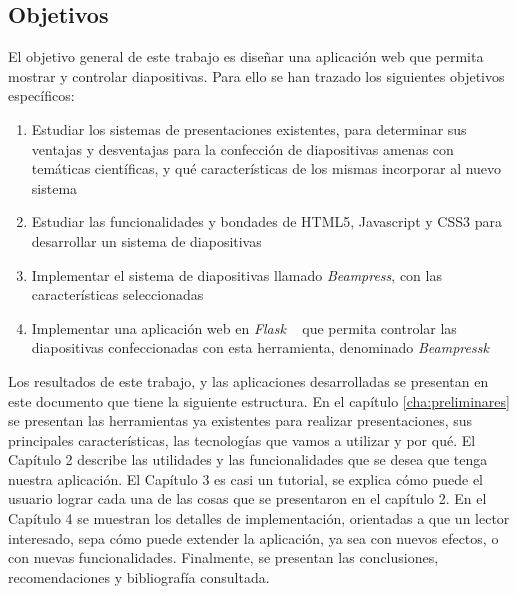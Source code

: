 \begin{introduction}
	\section*{Objetivos} %
	\label{sec:objetivos}

		El objetivo general de este trabajo es diseñar una aplicación web que permita mostrar y controlar diapositivas. Para ello se han trazado los siguientes objetivos específicos:

		\begin{enumerate}
			\item Estudiar los sistemas de presentaciones existentes, para determinar sus ventajas y desventajas para la confección de diapositivas amenas con temáticas científicas, y qué características de los mismas incorporar al nuevo sistema
			\item Estudiar las funcionalidades y bondades de HTML5, Javascript y CSS3 para desarrollar un sistema de diapositivas
			\item Implementar el sistema de diapositivas llamado \textit{Beampress}, con las características seleccionadas
			\item Implementar una aplicación web en \textit{Flask} ~\cite{flask} que permita controlar las diapositivas confeccionadas con esta herramienta, denominado \textit{Beampressk}
		\end{enumerate}

	
		Los resultados de este trabajo, y las aplicaciones desarrolladas se presentan en este documento que tiene la siguiente estructura. En el capítulo \ref{cha:preliminares} se presentan las herramientas ya existentes para realizar presentaciones, sus principales características, las tecnologías que vamos a utilizar y por qué. El Capítulo 2 describe las utilidades y las funcionalidades que se desea que tenga nuestra aplicación. El Capítulo 3 es casi un tutorial, se explica cómo puede el usuario lograr cada una de las cosas que se presentaron en el capítulo 2. En el Capítulo 4 se muestran los detalles de implementación, orientadas a que un lector interesado, sepa cómo puede extender la aplicación, ya sea con nuevos efectos, o con nuevas funcionalidades. Finalmente, se presentan las conclusiones, recomendaciones y bibliografía consultada.





\end{introduction}





